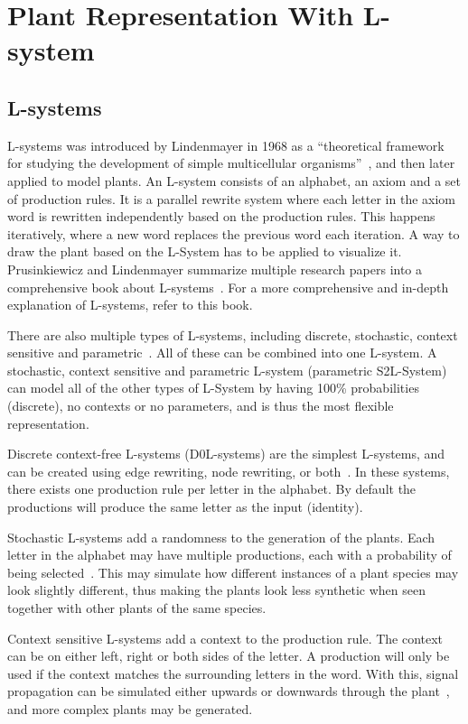 \chapter{Plant Representation With L-system}

\section{L-systems}
L-systems was introduced by Lindenmayer in 1968 as a ``theoretical framework for studying the development of simple multicellular organisms''~\cite{2012Prusinkiewicz}, and then later applied to model plants.
An L-system consists of an alphabet, an axiom and a set of production rules.
It is a parallel rewrite system where each letter in the axiom word is rewritten independently based on the production rules.
This happens iteratively, where a new word replaces the previous word each iteration.
A way to draw the plant based on the L-System has to be applied to visualize it.
Prusinkiewicz and Lindenmayer summarize multiple research papers into a comprehensive book about L-systems~\cite{2012Prusinkiewicz}.
For a more comprehensive and in-depth explanation of L-systems, refer to this book.

There are also multiple types of L-systems, including discrete, stochastic, context sensitive and parametric~\cite{2012Prusinkiewicz}.
All of these can be combined into one L-system.
A stochastic, context sensitive and parametric L-system (parametric S2L-System) can model all of the other types of L-System by having 100\% probabilities (discrete), no contexts or no parameters, and is thus the most flexible representation.

Discrete context-free L-systems (D0L-systems) are the simplest L-systems, and can be created using edge rewriting, node rewriting, or both~\cite{2012Prusinkiewicz}.
In these systems, there exists one production rule per letter in the alphabet.
By default the productions will produce the same letter as the input (identity).

Stochastic L-systems add a randomness to the generation of the plants.
Each letter in the alphabet may have multiple productions, each with a probability of being selected~\cite{2012Prusinkiewicz}.
This may simulate how different instances of a plant species may look slightly different, thus making the plants look less synthetic when seen together with other plants of the same species.

Context sensitive L-systems add a context to the production rule.
The context can be on either left, right or both sides of the letter.
A production will only be used if the context matches the surrounding letters in the word.
With this, signal propagation can be simulated either upwards or downwards through the plant~\cite{2012Prusinkiewicz}, and more complex plants may be generated.

